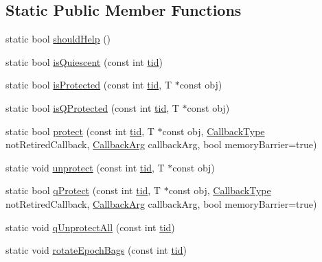 \subsection*{Static Public Member Functions}
\begin{DoxyCompactItemize}
\item 
static bool \hyperlink{classreclaimer__none_a0a343e289f2ec0bd11f565be7ba05f6c}{should\+Help} ()
\item 
static bool \hyperlink{classreclaimer__none_aa02fae6b14e76f5c2bf940b118eb54e3}{is\+Quiescent} (const int \hyperlink{microbench_2main_8cpp_a9ca9869868fe7e7a38a921cc7de4103f}{tid})
\item 
static bool \hyperlink{classreclaimer__none_a6515f01a73ccddf44303256344f7996f}{is\+Protected} (const int \hyperlink{microbench_2main_8cpp_a9ca9869868fe7e7a38a921cc7de4103f}{tid}, T $\ast$const obj)
\item 
static bool \hyperlink{classreclaimer__none_a73618ce8985667a837c5cbed9914def2}{is\+Q\+Protected} (const int \hyperlink{microbench_2main_8cpp_a9ca9869868fe7e7a38a921cc7de4103f}{tid}, T $\ast$const obj)
\item 
static bool \hyperlink{classreclaimer__none_a8bc86fce7f71f6238dfd50ce06803d66}{protect} (const int \hyperlink{microbench_2main_8cpp_a9ca9869868fe7e7a38a921cc7de4103f}{tid}, T $\ast$const obj, \hyperlink{globals_8h_a57f5c0d40b156d7d996492fb2f16e3cd}{Callback\+Type} not\+Retired\+Callback, \hyperlink{globals_8h_a3de64ef48066ac6430631c8b81a15345}{Callback\+Arg} callback\+Arg, bool memory\+Barrier=true)
\item 
static void \hyperlink{classreclaimer__none_a29e0601d98d0325c7a10ebc6346746b7}{unprotect} (const int \hyperlink{microbench_2main_8cpp_a9ca9869868fe7e7a38a921cc7de4103f}{tid}, T $\ast$const obj)
\item 
static bool \hyperlink{classreclaimer__none_afbc218123a9eef8bb282e77cf3b594c2}{q\+Protect} (const int \hyperlink{microbench_2main_8cpp_a9ca9869868fe7e7a38a921cc7de4103f}{tid}, T $\ast$const obj, \hyperlink{globals_8h_a57f5c0d40b156d7d996492fb2f16e3cd}{Callback\+Type} not\+Retired\+Callback, \hyperlink{globals_8h_a3de64ef48066ac6430631c8b81a15345}{Callback\+Arg} callback\+Arg, bool memory\+Barrier=true)
\item 
static void \hyperlink{classreclaimer__none_aeba1b3ef7a4aea47c3efb75a7547d0ce}{q\+Unprotect\+All} (const int \hyperlink{microbench_2main_8cpp_a9ca9869868fe7e7a38a921cc7de4103f}{tid})
\item 
static void \hyperlink{classreclaimer__none_a6ddaeb4e57e7b69d28cd01f16fd3e0a5}{rotate\+Epoch\+Bags} (const int \hyperlink{microbench_2main_8cpp_a9ca9869868fe7e7a38a921cc7de4103f}{tid})

\end{DoxyCompactItemize}
